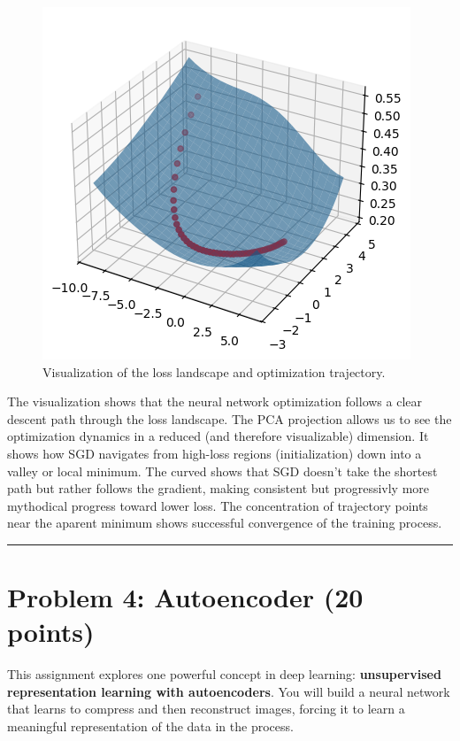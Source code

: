 \documentclass[
  letterpaper,
  DIV=11,
  numbers=noendperiod]{scrartcl}
\begin{document}
\begin{figure}[H]

{\centering \includegraphics{CS541_HW3_git_files/figure-latex/cs541_hw3_p2-3_d1a-prob3-output-1.png}

}

\caption{Visualization of the loss landscape and optimization
trajectory.}

\end{figure}%

The visualization shows that the neural network optimization follows a
clear descent path through the loss landscape. The PCA projection allows
us to see the optimization dynamics in a reduced (and therefore
visualizable) dimension. It shows how SGD navigates from high-loss
regions (initialization) down into a valley or local minimum. The curved
shows that SGD doesn't take the shortest path but rather follows the
gradient, making consistent but progressivly more mythodical progress
toward lower loss. The concentration of trajectory points near the
aparent minimum shows successful convergence of the training process.

\begin{center}\rule{0.5\linewidth}{0.5pt}\end{center}

\section{Problem 4: Autoencoder (20
points)}\label{problem-4-autoencoder-20-points}

This assignment explores one powerful concept in deep learning:
\textbf{unsupervised representation learning with autoencoders}. You
will build a neural network that learns to compress and then reconstruct
images, forcing it to learn a meaningful representation of the data in
the process.
\end{document}
